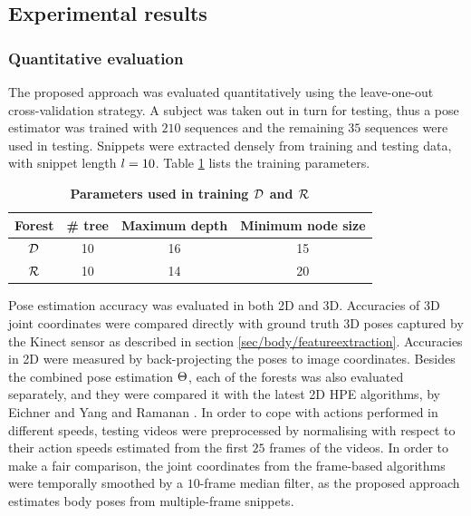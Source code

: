 \subsection{Experimental results}
\subsubsection{Quantitative evaluation}
\label{sec/body/quant}
The proposed approach was evaluated quantitatively using the leave-one-out cross-validation strategy. A subject was taken out in turn for testing, thus a pose estimator was trained with $210$ sequences and the remaining $35$ sequences were used in testing. 
Snippets were extracted densely from training and testing data, with snippet length $l = 10$. Table \ref{tab/body/rf_train_params} lists the training parameters. 

\begin{table}[ht]
	\centering
	\begin{tabular}{|c|c|c|c|}
		\hline 
		\textbf{Forest} & \textbf{\# tree} & \textbf{Maximum depth} & \textbf{Minimum node size} \\ \hline 
		$\mathcal{D}$ & 10 & 16 & 15 \\ \hline 
		$\mathcal{R}$ & 10 & 14 & 20 \\ \hline 
	\end{tabular} 
	\caption{\textbf{Parameters used in training $\mathcal{D}$ and $\mathcal{R}$}}
	\label{tab/body/rf_train_params}
\end{table}


Pose estimation accuracy was evaluated in both 2D and 3D. Accuracies of 3D joint coordinates were compared directly with ground truth 3D poses captured by the Kinect sensor as described in section \ref{sec/body/featureextraction}. Accuracies in 2D were measured by back-projecting the poses to image coordinates.  
Besides the combined pose estimation $\Theta$, each of the forests was also evaluated separately, and they were compared it with the latest 2D HPE algorithms, by Eichner \etal \cite{Eichner2012} and Yang and Ramanan \cite{Yang2011}. 
In order to cope with actions performed in different speeds, testing videos were preprocessed by normalising with respect to their action speeds estimated from the first $25$ frames of the videos.
In order to make a fair comparison, the joint coordinates from the frame-based algorithms were temporally smoothed by a $10$-frame median filter, as the proposed approach estimates body poses from multiple-frame snippets. 

